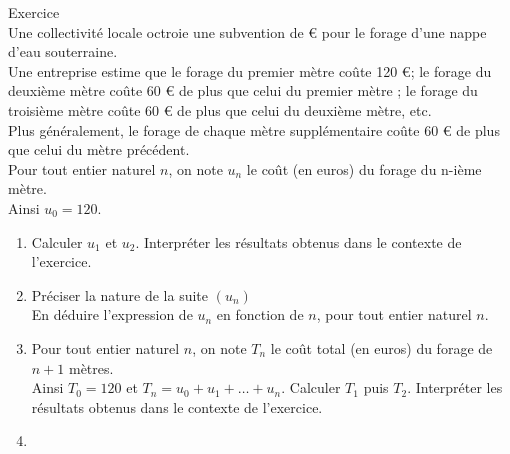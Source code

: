 \documentclass[a4paper,11pt,eval]{nsi}
\newcounter{exoNum}
\newcommand{\exo}[1]
{
	\addtocounter{exoNum}{1}
	{\titlefont\color{UGLiBlue}\Large Exercice\ \theexoNum\ \normalsize{#1}}\smallskip	
}
\begin{document}
\exo{}\\
Une collectivité locale octroie une subvention de  € pour le forage d'une nappe d'eau souterraine. \\
Une entreprise estime que le forage du premier mètre coûte 120 €; le forage du deuxième mètre coûte 60 € de plus que celui du premier mètre ; le forage du troisième mètre coûte 60 € de plus que celui du deuxième mètre, etc.\\
Plus généralement, le forage de chaque mètre supplémentaire coûte 60 € de plus que celui du mètre précédent.\\[.5em]    
Pour tout entier naturel $n$, on note $u_n$ le coût (en euros) du forage du n-ième mètre.\\
Ainsi $u_0=120$.
    
\begin{enumerate}
    \item Calculer $u_1$ et $u_2$. Interpréter les résultats obtenus dans le contexte de l'exercice.\\[.5em]
    \item Préciser la nature de la suite $\left(u_n\right)$\\
    En déduire l'expression de $u_n$ en fonction de $n$, pour tout entier naturel $n$.\\[.5em]
    \item Pour tout entier naturel $n$, on note $T_n$ le coût total (en euros) du forage de $n+1$ mètres.\\
    Ainsi $T_0=120$ et $T_n=u_0+u_1+\ldots+u_n$.
    Calculer $T_1$ puis $T_2$. Interpréter les résultats obtenus dans le contexte de l'exercice.\\[.5em]
    \item {}
    
    \end{enumerate}
\end{document}
